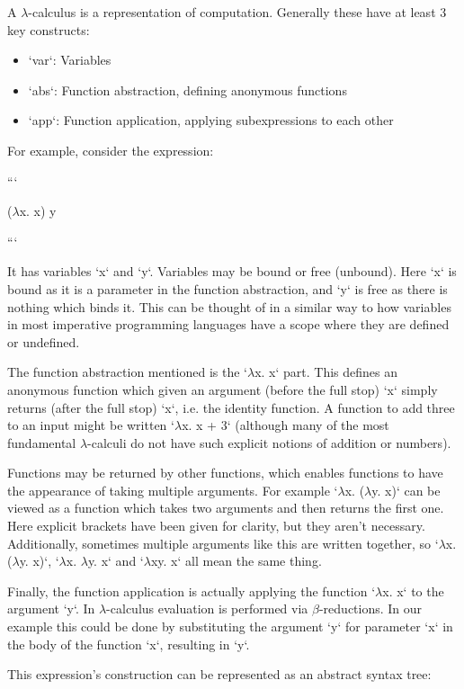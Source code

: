 \documentclass[a4paper,fleqn,12pt]{article}
\begin{document}
A $\lambda$-calculus is a representation of computation. Generally these have at least 3 key constructs:

\begin{itemize}
  \item `var`: Variables
  \item `abs`: Function abstraction, defining anonymous functions
  \item `app`: Function application, applying subexpressions to each other
\end{itemize}

For example, consider the expression:

```

($\lambda$x. x) y

```

It has variables `x` and `y`. Variables may be bound or free (unbound). Here `x` is bound as it is a parameter in the function abstraction, and `y` is free as there is nothing which binds it. This can be thought of in a similar way to how variables in most imperative programming languages have a scope where they are defined or undefined.

The function abstraction mentioned is the `$\lambda$x. x` part. This defines an anonymous function which given an argument (before the full stop) `x` simply returns (after the full stop) `x`, i.e. the identity function. A function to add three to an input might be written `$\lambda$x. x + 3` (although many of the most fundamental $\lambda$-calculi do not have such explicit notions of addition or numbers).

Functions may be returned by other functions, which enables functions to have the appearance of taking multiple arguments. For example `$\lambda$x. ($\lambda$y. x)` can be viewed as a function which takes two arguments and then returns the first one. Here explicit brackets have been given for clarity, but they aren’t necessary. Additionally, sometimes multiple arguments like this are written together, so `$\lambda$x. ($\lambda$y. x)`, `$\lambda$x. $\lambda$y. x` and `$\lambda$xy. x` all mean the same thing.

Finally, the function application is actually applying the function `$\lambda$x. x` to the argument `y`. In $\lambda$-calculus evaluation is performed via $\beta$-reductions. In our example this could be done by substituting the argument `y` for parameter `x` in the body of the function `x`, resulting in `y`.

This expression’s construction can be represented as an abstract syntax tree:
\end{document}
